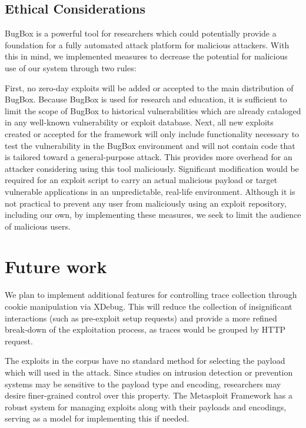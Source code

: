 \documentclass[letterpaper,twocolumn,10pt]{article}
\begin{document}
\subsection {Ethical Considerations}
BugBox is a powerful tool for researchers which could potentially provide a foundation for a fully automated attack platform for malicious attackers.  With this in mind, we implemented measures to decrease the potential for malicious use of our system through two rules:

First, no zero-day exploits will be added or accepted to the main distribution of BugBox. Because BugBox is used for research and education, it is sufficient to limit the scope of BugBox to historical vulnerabilities which are already cataloged in any well-known vulnerability or exploit database.
Next, all new exploits created or accepted for the framework will only include functionality necessary to test the vulnerability in the BugBox environment and will not contain code that is tailored toward a general-purpose attack.  This provides more overhead for an attacker considering using this tool maliciously.  Significant modification would be required for an exploit script to carry an actual malicious payload or target vulnerable applications in an unpredictable, real-life environment.
Although it is not practical to prevent any user from maliciously using an exploit repository, including our own, by implementing these measures, we seek to limit the audience of malicious users.

\section{Future work}
We plan to implement additional features for controlling trace collection through cookie manipulation via XDebug. This will reduce the collection of insignificant interactions (such as pre-exploit setup requests) and provide a more refined break-down of the exploitation process, as traces would be grouped by HTTP request.

The exploits in the corpus have no standard method for selecting the payload which will used in the attack. Since studies on intrusion detection or prevention systems may be sensitive to the payload type and encoding, researchers may desire finer-grained control over this property. The Metasploit Framework has a robust system for managing exploits along with their payloads and encodings, serving as a model for implementing this if needed.
\end{document}
